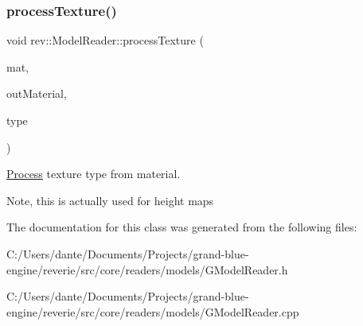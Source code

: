 \subsubsection{\texorpdfstring{processTexture()}{processTexture()}}
{\footnotesize\ttfamily void rev\+::\+Model\+Reader\+::process\+Texture (\begin{DoxyParamCaption}\item[{ai\+Material $\ast$}]{mat,  }\item[{\mbox{\hyperlink{structrev_1_1_material_data}{Material\+Data}} \&}]{out\+Material,  }\item[{ai\+Texture\+Type}]{type }\end{DoxyParamCaption})\hspace{0.3cm}{\ttfamily [protected]}}



\mbox{\hyperlink{classrev_1_1_process}{Process}} texture type from material. 

Note, this is actually used for height maps 

The documentation for this class was generated from the following files\+:\begin{DoxyCompactItemize}
\item 
C\+:/\+Users/dante/\+Documents/\+Projects/grand-\/blue-\/engine/reverie/src/core/readers/models/G\+Model\+Reader.\+h\item 
C\+:/\+Users/dante/\+Documents/\+Projects/grand-\/blue-\/engine/reverie/src/core/readers/models/G\+Model\+Reader.\+cpp\end{DoxyCompactItemize}
